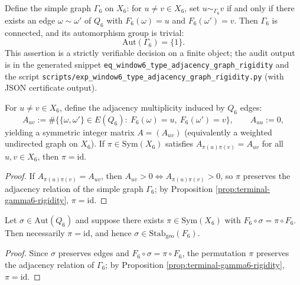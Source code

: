 \begin{enumerate}
  \begin{proposition}[Type adjacency graph rigidity eliminates ``relabeling freedom'': \texorpdfstring{$\mathrm{Aut}(\Gamma_6)=\{1\}$}{Aut(Gamma6)=1}]\label{prop:terminal-gamma6-rigidity}
  Define the simple graph \(\Gamma_6\) on \(X_6\): for \(u\neq v\in X_6\), set \(u\sim_{\Gamma_6} v\) if and only if there exists an edge \(\omega\sim\omega'\) of \(Q_6\) with
  \(F_6(\omega)=u\) and \(F_6(\omega')=v\).
  Then \(\Gamma_6\) is connected, and its automorphism group is trivial:
  \[
  \mathrm{Aut}(\Gamma_6)=\{1\}.
  \]
  This assertion is a strictly verifiable decision on a finite object; the audit output is in the generated snippet \texttt{eq\_window6\_type\_adjacency\_graph\_rigidity} and the script \texttt{scripts/exp\_window6\_type\_adjacency\_graph\_rigidity.py} (with JSON certificate output).
  \end{proposition}
  

  \begin{corollary}\label{cor:terminal-gamma6-multiplicity-rigidity}
  For \(u\neq v\in X_6\), define the adjacency multiplicity induced by \(Q_6\) edges:
  \[
  A_{uv}
  :=\#\bigl\{\{\omega,\omega'\}\in E(Q_6):\ F_6(\omega)=u,\ F_6(\omega')=v\bigr\},
  \qquad A_{uu}:=0,
  \]
  yielding a symmetric integer matrix \(A=(A_{uv})\) (equivalently a weighted undirected graph on \(X_6\)).
  If \(\pi\in\mathrm{Sym}(X_6)\) satisfies \(A_{\pi(u)\pi(v)}=A_{uv}\) for all \(u,v\in X_6\), then \(\pi=\mathrm{id}\).
  \begin{proof}
  If \(A_{\pi(u)\pi(v)}=A_{uv}\), then \(A_{uv}>0\iff A_{\pi(u)\pi(v)}>0\), so \(\pi\) preserves the adjacency relation of the simple graph \(\Gamma_6\); by Proposition \ref{prop:terminal-gamma6-rigidity}, \(\pi=\mathrm{id}\).
  \end{proof}
  \end{corollary}

  \begin{corollary}\label{cor:terminal-foldbin6-no-type-relabeling-by-geo}
  Let \(\sigma\in \mathrm{Aut}(Q_6)\) and suppose there exists \(\pi\in\mathrm{Sym}(X_6)\) with
  \(
  F_6\circ\sigma=\pi\circ F_6
  \).
  Then necessarily \(\pi=\mathrm{id}\), and hence \(\sigma\in \mathrm{Stab}_{\mathrm{geo}}(F_6)\).
  \begin{proof}
  Since \(\sigma\) preserves edges and \(F_6\circ\sigma=\pi\circ F_6\), the permutation \(\pi\) preserves the adjacency relation of \(\Gamma_6\); by Proposition \ref{prop:terminal-gamma6-rigidity}, \(\pi=\mathrm{id}\).
  \end{proof}
  \end{corollary}


\end{enumerate}
